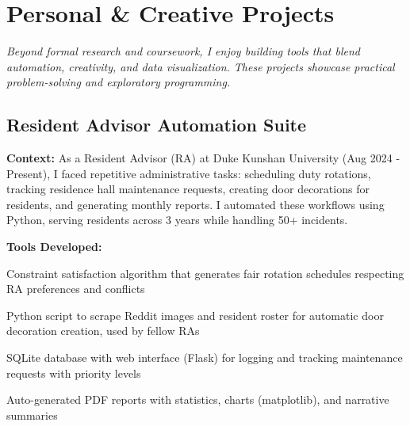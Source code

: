 
\section*{Personal \& Creative Projects}

\vspace{0.5em}

\textit{Beyond formal research and coursework, I enjoy building tools that blend automation, creativity, and data visualization. These projects showcase practical problem-solving and exploratory programming.}

\vspace{1em}


\subsection*{Resident Advisor Automation Suite}

\textbf{Context:} As a Resident Advisor (RA) at Duke Kunshan University (Aug 2024 - Present), I faced repetitive administrative tasks: scheduling duty rotations, tracking residence hall maintenance requests, creating door decorations for residents, and generating monthly reports. I automated these workflows using Python, serving residents across 3 years while handling 50+ incidents.

\vspace{0.5em}

\textbf{Tools Developed:}

\begin{description}[leftmargin=4em, labelwidth=3.5em, labelsep=0.5em]
  \item[Duty Scheduler:] Constraint satisfaction algorithm that generates fair rotation schedules respecting RA preferences and conflicts
  \item[Door Decor Generator:] Python script to scrape Reddit images and resident roster for automatic door decoration creation, used by fellow RAs
  \item[Maintenance Tracker:] SQLite database with web interface (Flask) for logging and tracking maintenance requests with priority levels
  \item[Monthly Reports:] Auto-generated PDF reports with statistics, charts (matplotlib), and narrative summaries
\end{description}


